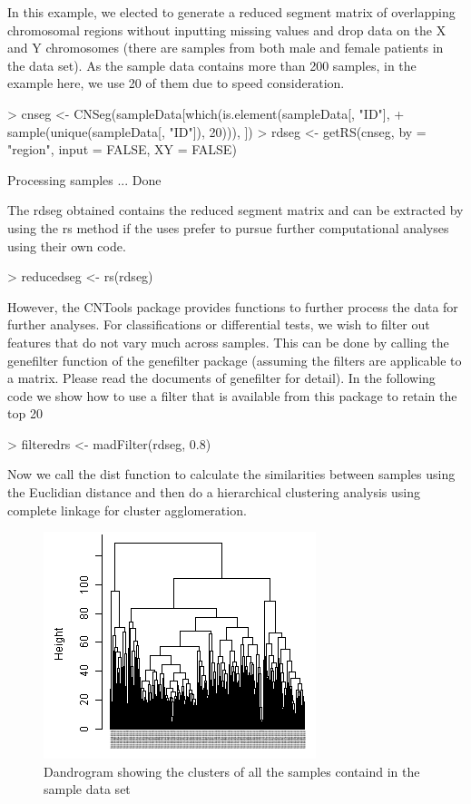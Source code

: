 \documentclass[12pt]{article}
\begin{document}
In this example, we elected to generate a reduced segment matrix of overlapping chromosomal regions without inputting missing values and drop data on the X and Y chromosomes (there are samples from both male and female patients in the data set). As the sample data contains more than 200 samples, in the example here, we use 20 of them due to speed consideration.

\begin{Schunk}
\begin{Sinput}
> cnseg <- CNSeg(sampleData[which(is.element(sampleData[, "ID"], 
+     sample(unique(sampleData[, "ID"]), 20))), ])
> rdseg <- getRS(cnseg, by = "region", input = FALSE, XY = FALSE)
\end{Sinput}
\begin{Soutput}
Processing samples ... Done
\end{Soutput}
\end{Schunk}

The rdseg obtained contains the reduced segment matrix and can be extracted by using the rs method if the uses prefer to pursue further computational analyses using their own code.

\begin{Schunk}
\begin{Sinput}
> reducedseg <- rs(rdseg)
\end{Sinput}
\end{Schunk}


However, the CNTools package provides functions to further process the data for further analyses. For classifications or differential tests, we wish to filter out features that do not vary much across samples. This can be done by calling the genefilter function of the genefilter package (assuming the filters are applicable to a matrix. Please read the documents of genefilter for detail). In the following code we show how to use a filter that is available from this package to retain the top 20%

\begin{Schunk}
\begin{Sinput}
> filteredrs <- madFilter(rdseg, 0.8)
\end{Sinput}
\end{Schunk}

Now we call the dist function to calculate the similarities between samples using the Euclidian distance and then do a hierarchical clustering analysis using complete linkage for cluster agglomeration.



\begin{figure}[!htp]
\begin{center}
\includegraphics{fig02}
\caption{Dandrogram showing the clusters of all the samples containd in the sample data set}\label{fig:fig02}
\end{center}
\end{figure}
\end{document}
